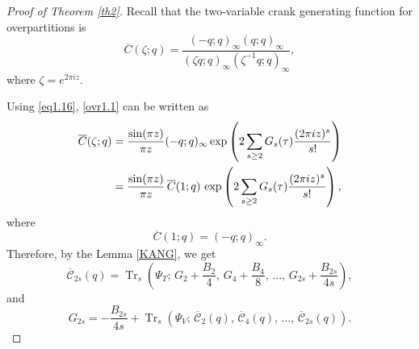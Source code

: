 \documentclass[12pt,oneside,reqno]{amsart}
\numberwithin{equation}{section}
\begin{document}
\begin{proof}[Proof of Theorem \ref{th2}]
	Recall that the two-variable crank generating function for overpartitions is
	\begin{equation}\label{ovr1.1}
		\overline{C}(\zeta;q)
		=
		\frac{(-q;q)_\infty(q;q)_\infty}
		{(\zeta q;q)_\infty(\zeta^{-1}q;q)_\infty},
	\end{equation}
	where $\zeta=e^{2\pi iz}$.
	
	Using \eqref{eq1.16},  \eqref{ovr1.1} can be written as
	\begin{align*}
		\overline{C}(\zeta;q)
		&=
		\frac{\sin(\pi z)}{\pi z}
		(-q;q)_\infty
		\exp\left(
		2\sum_{s\ge2}
		G_s(\tau)
		\frac{(2\pi iz)^s}{s!}
		\right)
		\notag\\
		&=
		\frac{\sin(\pi z)}{\pi z}
		\,\overline{C}(1;q)\,
		\exp\left(
		2\sum_{s\ge2}
		G_s(\tau)
		\frac{(2\pi iz)^s}{s!}
		\right),
	\end{align*}
	where
	\[
	\overline{C}(1;q)=(-q;q)_\infty.
	\]
	Therefore, by the Lemma \eqref{KANG}, we get
	\[
	\overline{\mathcal{C}}_{2s}(q)
	=
	\operatorname{Tr}_s
	\left(
	\Psi_T;
	\,
	G_2+\frac{B_2}{4},
	\,
	G_4+\frac{B_4}{8},
	\,
	\ldots,
	\,
	G_{2s}+\frac{B_{2s}}{4s}
	\right),
	\]
	and
	\[
	G_{2s}
	=
	-\frac{B_{2s}}{4s}
	+
	\operatorname{Tr}_s
	\left(
	\Psi_V;
	\,
	\overline{\mathcal{C}}_{2}(q),
	\,
	\overline{\mathcal{C}}_{4}(q),
	\,
	\ldots,
	\,
	\overline{\mathcal{C}}_{2s}(q)
	\right).
	\]
\end{proof}
\end{document}
